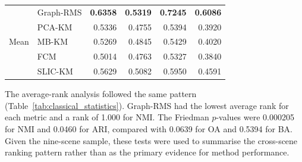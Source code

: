 \documentclass[10pt,a4paper,fleqn]{article}
\begin{document}
\begin{table}[!t]
\begin{tabular}{@{}llrrrr@{}}
\multirow{5}{*}{Mean}
& Graph-RMS & \textbf{0.6358} & \textbf{0.5319} & \textbf{0.7245} & \textbf{0.6086} \\
& PCA-KM    & 0.5336 & 0.4755 & 0.5394 & 0.3920 \\
& MB-KM     & 0.5269 & 0.4845 & 0.5429 & 0.4020 \\
& FCM       & 0.5014 & 0.4763 & 0.5327 & 0.3840 \\
& SLIC-KM   & 0.5629 & 0.5082 & 0.5950 & 0.4591 \\
\bottomrule
\end{tabular}
\end{table}

The average-rank analysis followed the same pattern
(Table~\ref{tab:classical_statistics}). Graph-RMS had the lowest average rank
for each metric and a rank of 1.000 for NMI. The Friedman \(p\)-values were
0.000205 for NMI and 0.0460 for ARI, compared with 0.0639 for OA and 0.5394
for BA. Given the nine-scene sample, these tests were used to summarise the
cross-scene ranking pattern rather than as the primary evidence for method
performance.
\end{document}
